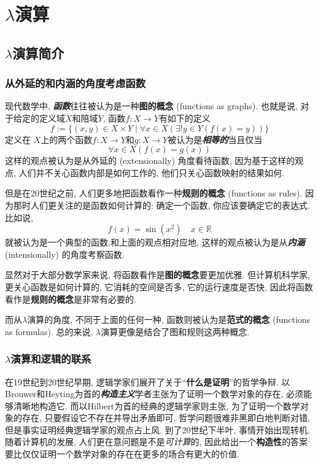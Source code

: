 \section{\texorpdfstring{$\lambda$}{lambda}演算}

\subsection{\texorpdfstring{$\lambda$}{lambda}演算简介}
\subsubsection{从外延的和内涵的角度考虑函数}
现代数学中, \textbf{\textit{函数}}往往被认为是一种\textbf{图的概念} (functions as graphs)\cite{vladimira.zorichMathematicalAnalysis2015}. 也就是说, 对于给定的定义域$X$和陪域$Y$, 函数$f:X\to Y$有如下的定义
\[
    f:=\{(x, y)\in X\times Y\mid \forall x\in X(\exists!y\in Y(f(x)=y))\}
\]
定义在 $X$上的两个函数$f:X\to Y$和$g:X\to Y$被认为是\textit{\textbf{相等的}}当且仅当
\[
    \forall x\in X(f(x)=g(x))    
\]
这样的观点被认为是从外延的 (extensionally) 角度看待函数, 因为基于这样的观点, 人们并不关心函数内部是如何工作的, 他们只关心函数映射的结果如何. 

但是在20世纪之前, 人们更多地把函数看作一种\textbf{规则的概念} (functions as rules). 因为那时人们更关注的是函数如何计算的: 确定一个函数, 你应该要确定它的表达式. 比如说, 
\[
    f(x)=\sin(x^2)  \quad x\in \mathbb R  
\]
就被认为是一个典型的函数.和上面的观点相对应地, 这样的观点被认为是从\textbf{\textit{内涵}} (intensionally) 的角度考察函数.

显然对于大部分数学家来说, 将函数看作是\textbf{图的概念}要更加优雅. 但计算机科学家, 更关心函数是如何计算的, 它消耗的空间是否多, 它的运行速度是否快, 因此将函数看作是\textbf{规则的概念}是非常有必要的. 

而从$\lambda$演算的角度, 不同于上面的任何一种, 函数则被认为是\textbf{范式的概念} (functions as formulas). 总的来说, $\lambda$演算更像是结合了图和规则这两种概念.

\subsubsection{\texorpdfstring{$\lambda$}{lambda}演算和逻辑的联系}
在19世纪到20世纪早期, 逻辑学家们展开了关于“\textbf{什么是证明}”的哲学争辩. 以Brouwer和Heyting为首的\textbf{\textit{构造主义}}学者主张为了证明一个数学对象的存在, 必须能够清晰地构造它. 而以Hilbert为首的经典的逻辑学家则主张, 为了证明一个数学对象的存在, 只要假设它不存在并导出矛盾即可. 哲学问题很难非黑即白地判断对错, 但是事实证明经典逻辑学家的观点占上风. 到了20世纪下半叶, 事情开始出现转机. 随着计算机的发展, 人们更在意问题是不是\textit{可计算}的, 因此给出一个\textbf{构造性}的答案要比仅仅证明一个数学对象的存在在更多的场合有更大的价值. 

